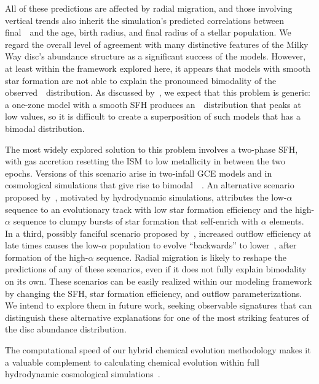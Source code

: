 \documentclass[draft2.tex]{subfiles}
\begin{document}
All of these predictions are affected by radial migration, and those involving 
vertical trends also inherit the simulation's predicted correlations between 
final~\absz~and the age, birth radius, and final radius of a stellar 
population. 
We regard the overall level of agreement with many distinctive features of the 
Milky Way disc's abundance structure as a significant success of the models. 
However, at least within the framework explored here, it appears that models 
with smooth star formation are not able to explain the pronounced bimodality 
of the observed~\afe~distribution. As discussed by~\citet{Vincenzo2021a}, 
we expect that this problem is generic: a one-zone model with a smooth SFH 
produces an~\afe~distribution that peaks at low values, so it is difficult 
to create a superposition of such models that has a bimodal distribution. 
\par 
The most widely explored solution to this problem involves a two-phase SFH, 
with gas accretion resetting the ISM to low metallicity in between the two 
epochs. 
Versions of this scenario arise in two-infall GCE models 
\citep[e.g.][]{Chiappini1997, Spitoni2019a, Khoperskov2021} and in cosmological 
simulations that give rise to bimodal~\afe~\citep{Mackereth2017, Grand2018, 
Buck2020b}. 
An alternative scenario proposed by~\citet{Clarke2019}, motivated by 
hydrodynamic simulations, attributes the low-$\alpha$ sequence to an 
evolutionary track with low star formation efficiency and the high-$\alpha$ 
sequence to clumpy bursts of star formation that self-enrich with $\alpha$ 
elements. 
In a third, possibly fanciful scenario proposed by~\citet{Weinberg2017}, 
increased outflow efficiency at late times causes the low-$\alpha$ population 
to evolve ``backwards'' to lower~\feh, after formation of the high-$\alpha$ 
sequence. 
Radial migration is likely to reshape the predictions of any of these scenarios, 
even if it does not fully explain bimodality on its own. 
These scenarios can be easily realized within our modeling framework by 
changing the SFH, star formation efficiency, and outflow parameterizations. 
We intend to explore them in future work, seeking observable signatures that 
can distinguish these alternative explanations for one of the most striking 
features of the disc abundance distribution. 
\par 
The computational speed of our hybrid chemical evolution methodology makes it a 
valuable complement to calculating chemical evolution within full hydrodynamic 
cosmological simulations~\citep[e.g.][]{Mackereth2017, Grand2018, Naiman2018, 
Buck2020b, Vincenzo2020}. 
\end{document}
